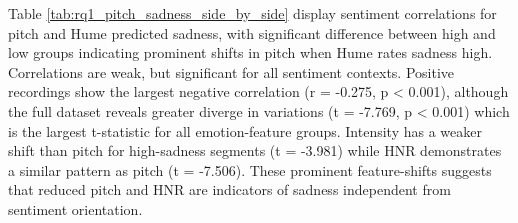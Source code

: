   Table \ref{tab:rq1_pitch_sadness_side_by_side} display sentiment correlations for pitch and Hume predicted sadness, with significant difference between high and low groups indicating prominent shifts in pitch when Hume rates sadness high. 
  Correlations are weak, but significant for all sentiment contexts. Positive recordings show the largest negative correlation (r = -0.275, p < 0.001), although the full dataset reveals greater diverge in variations (t = -7.769, p < 0.001) which is the 
  largest t-statistic for all emotion-feature groups. Intensity has a weaker shift than pitch for high-sadness segments (t = -3.981) while HNR demonstrates a similar pattern as pitch (t = -7.506). 
  These prominent feature-shifts suggests that reduced pitch and HNR are indicators of sadness independent from sentiment orientation.

  

  
